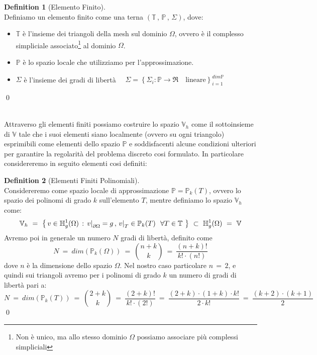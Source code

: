 \documentclass[12pt,a4paper]{report}
\theoremstyle{theorem}
\theoremstyle{theorem}
\theoremstyle{definition}
\newtheorem{definition}{Definition}[section]
\newcommand\restr[2]{{%
  \left.\kern-\nulldelimiterspace %
  #1 %
  \right|_{#2} %
  }}
\begin{document}
\begin{definition}[Elemento Finito]  \label{Elemento Finito}
\hfill \\
Definiamo un elemento finito come una terna $( \mathbb{T} \, , \, \mathbb{P} \, , \, \Sigma )$, dove:
\begin{itemize}
	\item $\mathbb{T}$ è l'insieme dei triangoli della mesh sul dominio $\Omega$, ovvero è il complesso simpliciale associato\footnote{Non è unico, ma allo stesso dominio $\Omega$ possiamo associare più complessi simpliciali} al dominio $\Omega$.
	\item $\mathbb{P}$ è lo spazio locale che utilizziamo per l'approssimazione.
	\item $\Sigma$ è l'insieme dei gradi di libertà $\quad \Sigma = \left \{ \Sigma_{i} : \mathbb{P} \rightarrow \Re \quad \text{lineare} \right \}_{i=1}^{dim \mathbb{P}} $
\end{itemize}
\qed
\end{definition}
\hfill \\
Attraverso gli elementi finiti possiamo costruire lo spazio $\mathbb{V}_{h}$ come il sottoinsieme di $\mathbb{V}$ tale che i suoi elementi siano localmente (ovvero su ogni triangolo) esprimibili come elementi dello spazio $\mathbb{P}$ e soddisfacenti alcune condizioni ulteriori per garantire la regolarità del problema discreto cosi formulato. In particolare considereremo in seguito elementi cosi definiti:
\begin{definition}[Elementi Finiti Polinomiali]  \label{Elementi Finiti Polinomiali}
\hfill \\
Considereremo come spazio locale di approssimazione $\mathbb{P} = \mathbb{P}_{k}(T)$, ovvero lo spazio dei polinomi di grado $k$ sull'elemento $T$, mentre definiamo lo spazio $\mathbb{V}_{h}$ come:
\[ \mathbb{V}_{h} \ = \ \left \{ \, v \in \mathbb{H}_{g}^{1}(\Omega) \, :  \, \restr{v}{\partial \Omega} = g \, , \, \restr{v}{T} \in  \mathbb{P}_{k}(T) \ \ \forall T \in \mathbb{T} \ \right \} \ \subset \  \mathbb{H}_{g}^{1}(\Omega) \ = \ \mathbb{V} \]
Avremo poi in generale un numero $N$ gradi di libertà, definito come
\[ N \ = \ dim \left( \mathbb{P}_{k}(\Omega) \right) \ = \ \binom{n+k}{k} \ = \ \frac{(n+k)!}{k! \cdot (n!)} \]
dove $n$ è la dimensione dello spazio $\Omega$. Nel nostro caso particolare $n \, = \, 2$, e quindi sui triangoli avremo per i polinomi di grado $k$ un numero di gradi di libertà pari a:
\[ N \ = \ dim \left( \mathbb{P}_{k}(T) \right) \ = \ \binom{2+k}{k} \ = \ \frac{(2+k)!}{k! \cdot (2!)} \ = \ \frac{(2+k) \cdot (1+k) \cdot k!}{2 \cdot k!} \ = \ \frac{(k+2) \cdot (k+1)}{2} \]
\qed
\end{definition}
\end{document}
